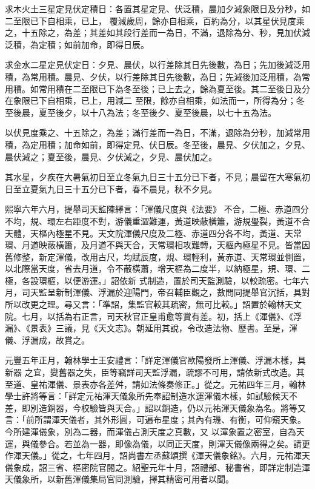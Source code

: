 \begin{pinyinscope}
 求木火土三星定見伏定積日：各置其星定見、伏泛積，晨加夕減象限日及分秒，如二至限已下自相乘，已上，
 覆減歲周，餘亦自相乘，百約為分，以其星伏見度乘之，十五除之，為差；其差如其段行差而一為日，不滿，退除為分、秒，見加伏減泛積，為定積；如前加命，即得日辰。



 求金水二星定見伏定日：夕見、晨伏，以行差除其日先後數，為日；先加後減泛用積，為常用積。晨見、夕伏，以行差除其日先後數，為日；先減後加泛用積，為常用積。如常用積在二至限已下為冬至後；已上去之，餘為夏至後。其二至後日及分在象限已下自相乘，已上，用減二
 至限，餘亦自相乘，如法而一，所得為分；冬至後晨，夏至後夕，以十八為法；冬至後夕、夏至後晨，以七十五為法。



 以伏見度乘之、十五除之，為差；滿行差而一為日，不滿，退除為分秒，加減常用積，為定用積；加命如前，即得定見、伏日辰。冬至後，晨見、夕伏加之，夕見、晨伏減之；夏至後，晨見、夕伏減之，夕見、晨伏加之。



 其水星，夕疾在大暑氣初日至立冬氣九日三十五分已下者，不見；晨留在大寒氣初日至立夏氣九日三十五分已下者，春不晨見，秋不夕見。



 熙寧六年六月，提舉司天監陳繹言：「渾儀尺度與《法要》
 不合，二極、赤道四分不均，規、環左右距度不對，游儀重澀難運，黃道映蔽橫簫，游規璺裂，黃道不合天體，天樞內極星不見。天文院渾儀尺度及二極、赤道四分各不均，黃道、天常環、月道映蔽橫簫，及月道不與天合，天常環相攻難轉，天樞內極星不見。皆當因舊修整，新定渾儀，改用古尺，均賦辰度，規、環輕利，黃赤道、天常環並側置，以北際當天度，省去月道，令不蔽橫蕭，增天樞為二度半，以納極星，規、環、二極，各設環樞，以便游運。」詔依新
 式制造，置於司天監測驗，以較疏密。七年六月，司天監呈新制渾儀、浮漏於迎陽門，帝召輔臣觀之，數問同提舉官沉括，具對所以改更之理。尋又言：「準詔，集監官較其疏密，無可比較。」詔置於翰林天文院。七月，以括為右正言，司天秋官正皇甫愈等賞有差。初，括上《渾儀》、《浮漏》、《景表》三議，見《天文志》。朝延用其說，令改造法物、歷書。至是，渾儀、浮漏成，故賞之。



 元豐五年正月，翰林學士王安禮言：「詳定渾儀官歐陽發所上渾儀、浮漏木樣，具新器
 之宜，變舊器之失，臣等竊詳司天監浮漏，疏謬不可用，請依新式改造。其至道、皇祐渾儀、景表亦各差舛，請如法條奏修正。」從之。元祐四年三月，翰林學士許將等言：「詳定元祐渾天儀象所先奉詔制造水運渾儀木樣，如試驗候天不差，即別造銅器，今校驗皆與天合。」詔以銅造，仍以元祐渾天儀象為名。將等又言：「前所謂渾天儀者，其外形圓，可遍布星度；其內有璣、有衡，可仰窺天象。今所建渾儀象，別為二器，而渾儀占測天度之真數，又
 以渾象置之密室，自為天運，與儀參合。若並為一器，即像為儀，以同正天度，則渾天儀像兩得之矣。請更作渾天儀。」從之，七年四月，詔尚書左丞蘇頌撰《渾天儀象銘》。六月，元祐渾天儀象成，詔三省、樞密院官閱之。紹聖元年十月，詔禮部、秘書省，即詳定制造渾天儀象所，以新舊渾儀集局官同測驗，擇其精密可用者以聞。




\end{pinyinscope}
